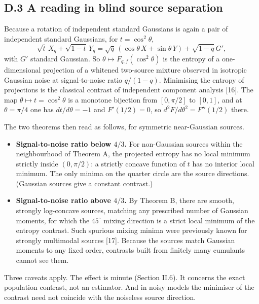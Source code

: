 \documentclass[
  british,
  10pt,
]{article}
\providecommand{\tightlist}{%
  \setlength{\itemsep}{0pt}\setlength{\parskip}{0pt}}
\begin{document}
\subsection{D.3 A reading in blind source
separation}\label{d.3-a-reading-in-blind-source-separation}

Because a rotation of independent standard Gaussians is again a pair of
independent standard Gaussians, for \(t=\cos^2\theta\), \[
\sqrt t\,X_q+\sqrt{1-t}\,Y_q=\sqrt q\,(\cos\theta\,X+\sin\theta\,Y)+\sqrt{1-q}\,G',
\] with \(G'\) standard Gaussian. So
\(\theta\mapsto F_{q,f}(\cos^2\theta)\) is the entropy of a
one-dimensional projection of a whitened two-source mixture observed in
isotropic Gaussian noise at signal-to-noise ratio \(q/(1-q)\).
Minimising the entropy of projections is the classical contrast of
independent component analysis {[}16{]}. The map
\(\theta\mapsto t=\cos^2\theta\) is a monotone bijection from
\([0,\pi/2]\) to \([0,1]\), and at \(\theta=\pi/4\) one has
\(dt/d\theta=-1\) and \(F'(1/2)=0\), so \(d^2F/d\theta^2=F''(1/2)\)
there.

The two theorems then read as follows, for symmetric near-Gaussian
sources.

\begin{itemize}
\tightlist
\item
  \textbf{Signal-to-noise ratio below \(4/3\).} For non-Gaussian sources
  within the neighbourhood of Theorem A, the projected entropy has no
  local minimum strictly inside \((0,\pi/2)\): a strictly concave
  function of \(t\) has no interior local minimum. The only minima on
  the quarter circle are the source directions. (Gaussian sources give a
  constant contrast.)
\item
  \textbf{Signal-to-noise ratio above \(4/3\).} By Theorem B, there are
  smooth, strongly log-concave sources, matching any prescribed number
  of Gaussian moments, for which the \(45^\circ\) mixing direction is a
  strict local minimum of the entropy contrast. Such spurious mixing
  minima were previously known for strongly multimodal sources {[}17{]}.
  Because the sources match Gaussian moments to any fixed order,
  contrasts built from finitely many cumulants cannot see them.
\end{itemize}

Three caveats apply. The effect is minute (Section II.6). It concerns
the exact population contrast, not an estimator. And in noisy models the
minimiser of the contrast need not coincide with the noiseless source
direction.
\end{document}
